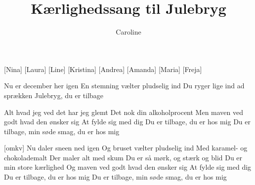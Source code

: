 \documentclass[a4paper,11pt]{article}
\title{Kærlighedssang til Julebryg}
\author{Caroline}
\begin{document}
\maketitle

\begin{roles}
    [Nina]
    [Laura]
    [Line]
    [Kristina]
    [Andrea]
    [Amanda]
    [Maria]
    [Freja]
\end{roles}

\begin{props}
\end{props}

\begin{song}
   Nu er december her igen
En stemning vælter pludselig ind
Du ryger lige ind ad sprækken
Julebryg, du er tilbage

 Alt hvad jeg ved det har jeg glemt
Det nok din alkoholprocent
Men maven ved godt hvad den ønsker sig
At fylde sig med dig
Du er tilbage, du er hos mig
Du er tilbage, min søde smag, du er hos mig

 [omkv] Nu daler sneen ned igen
Og bruset vælter pludselig ind
Med karamel- og chokolademalt
Der maler alt med skum
Du er så mørk, og stærk og blid
Du er min store kærlighed
Og maven ved godt hvad den ønsker sig
At fylde sig med dig
Du er tilbage, du er hos mig
Du er tilbage, min søde smag, du er hos mig


\end{song}
\end{document}
